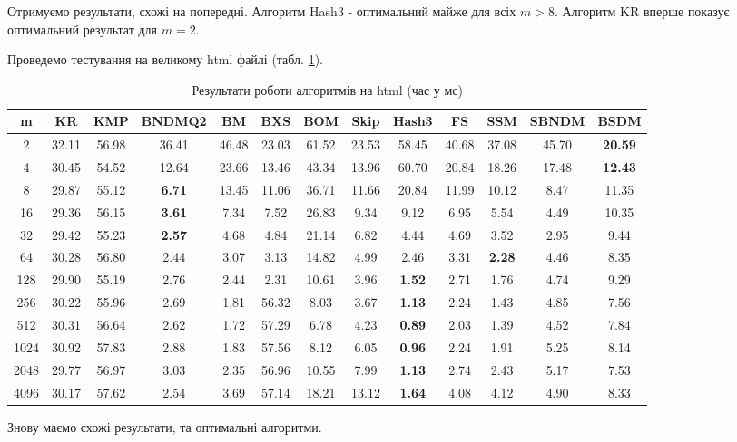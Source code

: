 \documentclass[a4paper,14pt]{extarticle} %
\begin{document}
				Отримуємо результати, схожі на попередні. Алгоритм Hash3 - оптимальний майже для всіх $m>8$. Алгоритм KR вперше показує оптимальний результат для $m=2$.

				Проведемо тестування на великому html файлі (табл. \ref{table:html_random}).

				\begin{table}[H]
					\centering
					\scriptsize
					\begin{tabular}{|c|c|c|c|c|c|c|c|c|c|c|c|c|}
					\hline
					\textbf{m} & \textbf{KR} & \textbf{KMP} & \textbf{BNDMQ2} & \textbf{BM} & \textbf{BXS} & \textbf{BOM} & \textbf{Skip} & \textbf{Hash3} & \textbf{FS} & \textbf{SSM} & \textbf{SBNDM} & \textbf{BSDM} \\
					\hline
					2 & 32.11 & 56.98 & 36.41 & 46.48 & 23.03 & 61.52 & 23.53 & 58.45 & 40.68 & 37.08 & 45.70 & \textbf{20.59} \\
					\hline
					4 & 30.45 & 54.52 & 12.64 & 23.66 & 13.46 & 43.34 & 13.96 & 60.70 & 20.84 & 18.26 & 17.48 & \textbf{12.43} \\
					\hline
					8 & 29.87 & 55.12 & \textbf{6.71} & 13.45 & 11.06 & 36.71 & 11.66 & 20.84 & 11.99 & 10.12 & 8.47 & 11.35 \\
					\hline
					16 & 29.36 & 56.15 & \textbf{3.61} & 7.34 & 7.52 & 26.83 & 9.34 & 9.12 & 6.95 & 5.54 & 4.49 & 10.35 \\
					\hline
					32 & 29.42 & 55.23 & \textbf{2.57} & 4.68 & 4.84 & 21.14 & 6.82 & 4.44 & 4.69 & 3.52 & 2.95 & 9.44 \\
					\hline
					64 & 30.28 & 56.80 & 2.44 & 3.07 & 3.13 & 14.82 & 4.99 & 2.46 & 3.31 & \textbf{2.28} & 4.46 & 8.35 \\
					\hline
					128 & 29.90 & 55.19 & 2.76 & 2.44 & 2.31 & 10.61 & 3.96 & \textbf{1.52} & 2.71 & 1.76 & 4.74 & 9.29 \\
					\hline
					256 & 30.22 & 55.96 & 2.69 & 1.81 & 56.32 & 8.03 & 3.67 & \textbf{1.13} & 2.24 & 1.43 & 4.85 & 7.56 \\
					\hline
					512 & 30.31 & 56.64 & 2.62 & 1.72 & 57.29 & 6.78 & 4.23 & \textbf{0.89} & 2.03 & 1.39 & 4.52 & 7.84 \\
					\hline
					1024 & 30.92 & 57.83 & 2.88 & 1.83 & 57.56 & 8.12 & 6.05 & \textbf{0.96} & 2.24 & 1.91 & 5.25 & 8.14 \\
					\hline
					2048 & 29.77 & 56.97 & 3.03 & 2.35 & 56.96 & 10.55 & 7.99 & \textbf{1.13} & 2.74 & 2.43 & 5.17 & 7.53 \\
					\hline
					4096 & 30.17 & 57.62 & 2.54 & 3.69 & 57.14 & 18.21 & 13.12 & \textbf{1.64} & 4.08 & 4.12 & 4.90 & 8.33 \\
					\hline
					\end{tabular}
					\caption{Результати роботи алгоритмів на html (час у мс)}
					\label{table:html_random}
					\end{table}
				Знову маємо схожі результати, та оптимальні алгоритми.
\end{document}
